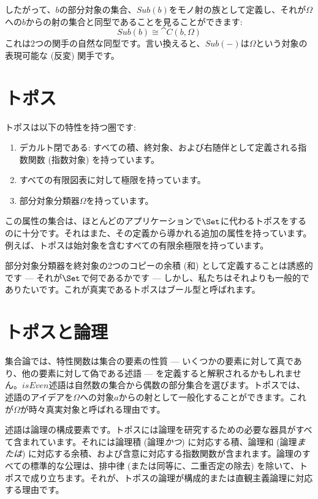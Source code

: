 したがって、\(b\)の部分対象の集合、\(\mathit{Sub}(b)\)をモノ射の族として定義し、それが\(\Omega\)への\(b\)からの射の集合と同型であることを見ることができます: 
\[\mathit{Sub}(b) \cong \cat{C}(b, \Omega)\]
これは2つの関手の自然な同型です。言い換えると、\(\mathit{Sub}(-)\)は\(\Omega\)という対象の表現可能な (反変) 関手です。

\section{トポス}

トポスは以下の特性を持つ圏です: 

\begin{enumerate}
  \tightlist
  \item
        デカルト閉である: すべての積、終対象、および右随伴として定義される指数関数 (指数対象) を持っています。
  \item
        すべての有限図表に対して極限を持っています。
  \item
        部分対象分類器\(\Omega\)を持っています。
\end{enumerate}

この属性の集合は、ほとんどのアプリケーションで\(\Set\)に代わるトポスをするのに十分です。それはまた、その定義から導かれる追加の属性を持っています。例えば、トポスは始対象を含むすべての有限余極限を持っています。

部分対象分類器を終対象の2つのコピーの余積 (和) として定義することは誘惑的です --- それが\(\Set\)で何であるかです --- しかし、私たちはそれよりも一般的でありたいです。これが真実であるトポスはブール型と呼ばれます。

\section{トポスと論理}

集合論では、特性関数は集合の要素の性質 --- いくつかの要素に対して真であり、他の要素に対して偽である述語 --- を定義すると解釈されるかもしれません。\(\mathit{isEven}\)述語は自然数の集合から偶数の部分集合を選びます。トポスでは、述語のアイデアを\(\Omega\)への対象\(a\)からの射として一般化することができます。これが\(\Omega\)が時々真実対象と呼ばれる理由です。

述語は論理の構成要素です。トポスには論理を研究するための必要な器具がすべて含まれています。それには論理積 (論理\emph{かつ}) に対応する積、論理和 (論理\emph{または}) に対応する余積、および含意に対応する指数関数が含まれます。論理のすべての標準的な公理は、排中律 (または同等に、二重否定の除去) を除いて、トポスで成り立ちます。それが、トポスの論理が構成的または直観主義論理に対応する理由です。

